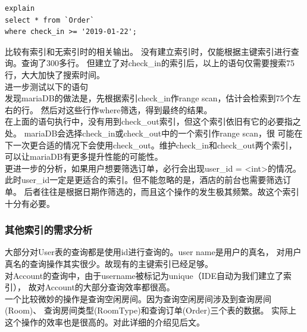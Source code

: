 \documentclass{myreport}
\begin{document}
\begin{verbatim}
explain 
select * from `Order`
where check_in >= '2019-01-22';
\end{verbatim}


比较有索引和无索引时的相关输出。
没有建立索引时，仅能根据主键索引进行查询。查询了300多行。
但建立了对check\_in的索引后，以上的语句仅需要搜索75行，大大加快了搜索时间。\\

进一步测试以下的语句\\
发现mariaDB的做法是，先根据索引check\_in作range scan，估计会检索到75个左右的行。
然后对这些行作where筛选，得到最终的结果。\\

在上面的语句执行中，没有用到check\_out索引，但这个索引依旧有它的必要指之处。
mariaDB会选择check\_in或check\_out中的一个索引作range scan，很
可能在下一次更合适的情况下会使用check\_out。维护check\_in和check\_out两个索引，
可以让mariaDB有更多提升性能的可能性。\\

更进一步的分析，如果用户想要筛选订单，必行会出现user\_id = <int>的情况。
此时user\_id一定是更适合的索引。但不能忽略的是，酒店的前台也需要筛选订单。
后者往往是根据日期作筛选的，而且这个操作的发生极其频繁。故这个索引十分有必要。\\

\subsubsection{其他索引的需求分析}
大部分对User表的查询都是使用id进行查询的。user name是用户的真名，
对用户真名的查询操作其实很少。故现有的主键索引已经足够。\\

对Account的查询中，由于username被标记为unique（IDE自动为我们建立了索引），
故对Account的大部分查询效率都很高。\\

一个比较微妙的操作是查询空闲房间。因为查询空闲房间涉及到查询房间(Room)、
查询房间类型(RoomType)和查询订单(Order)三个表的数据。
实际上这个操作的效率也是很高的。对此详细的介绍见后文。\\
\end{document}
